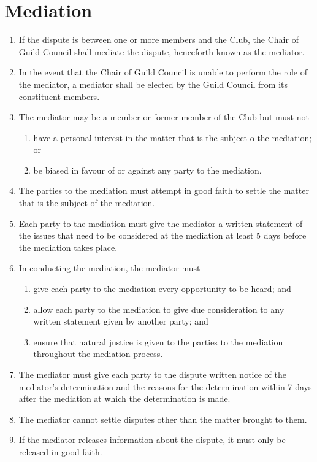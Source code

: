 \documentclass[11pt]{article} %
\begin{document}
\section{Mediation}
\begin{enumerate}
    \item  If the dispute is between one or more members and the Club, the Chair of Guild Council shall mediate the dispute, henceforth known as the mediator.
    \item In the event that the Chair of Guild Council is unable to perform the role of the mediator, a mediator shall be elected by the Guild Council from its constituent members.
    \item The mediator may be a member or former member of the Club but must not-
    \begin{enumerate}
        \item have a personal interest in the matter that is the subject o the mediation; or
        \item be biased in favour of or against any party to the mediation.
    \end{enumerate}
    \item  The parties to the mediation must attempt in good faith to settle the matter that is the subject of the mediation.
    \item Each party to the mediation must give the mediator a written statement of the issues that need to be considered at the mediation at least 5 days before the mediation takes place.
    \item In conducting the mediation, the mediator must-
    \begin{enumerate}
        \item give each party to the mediation every opportunity to be heard; and
        \item allow each party to the mediation to give due consideration to any written statement given by another party; and
        \item ensure that natural justice is given to the parties to the mediation throughout the mediation process. 
    \end{enumerate}
    \item The mediator must give each party to the dispute written notice of the mediator's determination and the reasons for the determination within 7 days after the mediation at which the determination is made.
    \item The mediator cannot settle disputes other than the matter brought to them.
    \item If the mediator releases information about the dispute, it must only be released in good faith.
\end{enumerate}
\end{document}
